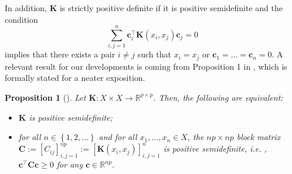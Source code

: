 \documentclass[12pt]{article}
\theoremstyle{plain}
\newtheorem{proposition}{Proposition}
\theoremstyle{remark}
\newcommand{\curly}[1]{\left\{ #1 \right\}}
\newcommand{\R}[0]{\mathbb{R}}
\newcommand{\ie}{\textit{i.e. }}
\newcommand{\dVec}[1]{{\bm{#1}}}            %
\newcommand{\latMatr}[1]{\mathbf{#1}}          %
\newcommand{\tobi}[1]{\textcolor{teal}{#1}}
\begin{document}
    In addition, $\latMatr{K}$ is strictly positive definite if it is positive semidefinite and the condition
    \begin{equation}
        \sum_{i,j=1}^n {\dVec{c}}_i^\top \latMatr K ({x}_i,{x}_j) {\dVec{c}}_j = 0 
    \end{equation}
    implies that there exists a pair $ i\ne j$ such that ${x}_i={x}_j$ or ${\dVec{c}}_1=\dots={\dVec{c}}_n=0$. {A relevant result for our developments is coming from Proposition 1 in \cite{zastavnyi_analog_2023}, which is formally stated for a neater exposition.} 
    \begin{proposition}[]
        \label{prop:equivalentFormPositDef}
        Let $\latMatr{K} : X \times X \to \R^{p\times p}$. Then, {the following} are equivalent:
        \begin{itemize}
            \item $\latMatr{K}$ is positive semidefinite;
            \item for all $n\in\curly{1,2,\dots}$ and for all ${x}_1,\dots, {x}_n\in X$, the $np \times np$ block matrix $\latMatr C:=[C_{ij}]_{i,j=1}^{np}:=[\latMatr{K}({x}_i,{x}_j)]_{i,j=1}^{{n}}$ is positive semidefinite, \ie, $\dVec{c}^\top \latMatr C \dVec{c} \geq 0$ for any $\dVec{c} \in \mathbb{R}^{np}$. 
        \end{itemize}
    \end{proposition}
        
\end{document}
